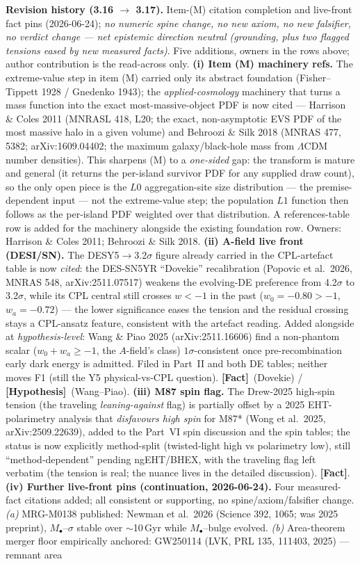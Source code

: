 \documentclass[11pt]{article}
\newcommand{\fact}{\textcolor{green!40!black}{\textbf{[Fact]}}}
\newcommand{\hyp}{\textcolor{orange!80!black}{\textbf{[Hypothesis]}}}
\begin{document}
{\smallskip\noindent\textbf{Revision history (3.16 $\to$ 3.17).} Item-(M) citation completion and live-front fact pins (2026-06-24); \emph{no numeric spine change, no new axiom, no new falsifier, no verdict change --- net epistemic direction neutral (grounding, plus two flagged tensions eased by new measured facts)}. Five additions, owners in the rows above; author contribution is the read-across only. \textbf{(i) Item (M) machinery refs.} The extreme-value step in item (M) carried only its abstract foundation (Fisher--Tippett 1928 / Gnedenko 1943); the \emph{applied-cosmology} machinery that turns a mass function into the exact most-massive-object PDF is now cited --- Harrison \& Coles 2011 (MNRASL 418, L20; the exact, non-asymptotic EVS PDF of the most massive halo in a given volume) and Behroozi \& Silk 2018 (MNRAS 477, 5382; arXiv:1609.04402; the maximum galaxy/black-hole mass from $\Lambda$CDM number densities). This sharpens (M) to a \emph{one-sided} gap: the transform is mature and general (it returns the per-island survivor PDF for any supplied draw count), so the only open piece is the $L0$ aggregation-site size distribution --- the premise-dependent input --- not the extreme-value step; the population $L1$ function then follows as the per-island PDF weighted over that distribution. A references-table row is added for the machinery alongside the existing foundation row. Owners: Harrison \& Coles 2011; Behroozi \& Silk 2018. \textbf{(ii) A-field live front (DESI/SN).} The DESY5$\to$3.2$\sigma$ figure already carried in the CPL-artefact table is now \emph{cited}: the DES-SN5YR ``Dovekie'' recalibration (Popovic et al.\ 2026, MNRAS 548, arXiv:2511.07517) weakens the evolving-DE preference from 4.2$\sigma$ to 3.2$\sigma$, while its CPL central still crosses $w<-1$ in the past ($w_0=-0.80>-1$, $w_a=-0.72$) --- the lower significance eases the tension and the residual crossing stays a CPL-ansatz feature, consistent with the artefact reading. Added alongside at \emph{hypothesis-level}: Wang \& Piao 2025 (arXiv:2511.16606) find a non-phantom scalar ($w_0+w_a\ge-1$, the $A$-field's class) $1\sigma$-consistent once pre-recombination early dark energy is admitted. Filed in Part~II and both DE tables; neither moves F1 (still the Y5 physical-vs-CPL question). \fact\ (Dovekie) / \hyp\ (Wang--Piao). \textbf{(iii) M87 spin flag.} The Drew-2025 high-spin tension (the traveling \emph{leaning-against} flag) is partially offset by a 2025 EHT-polarimetry analysis that \emph{disfavours high spin} for M87* (Wong et al.\ 2025, arXiv:2509.22639), added to the Part~VI spin discussion and the spin tables; the status is now explicitly method-split (twisted-light high vs polarimetry low), still ``method-dependent'' pending ngEHT/BHEX, with the traveling flag left verbatim (the tension is real; the nuance lives in the detailed discussion). \fact. \textbf{(iv) Further live-front pins (continuation, 2026-06-24).} Four measured-fact citations added; all consistent or supporting, no spine/axiom/falsifier change. \emph{(a)} MRG-M0138 published: Newman et al.\ 2026 (Science 392, 1065; was 2025 preprint), $M_\bullet$--$\sigma$ stable over $\sim$10\,Gyr while $M_\bullet$--bulge evolved. \emph{(b)} Area-theorem merger floor empirically anchored: GW250114 (LVK, PRL 135, 111403, 2025) --- remnant area }
\end{document}
